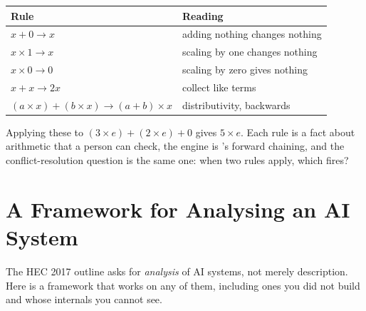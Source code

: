 \begin{examplebox}
\begin{tabular}{@{}L{6.0cm}L{8.6cm}@{}}
\toprule
\textbf{Rule} & \textbf{Reading} \\
\midrule
$x + 0 \to x$ & adding nothing changes nothing \\
$x \times 1 \to x$ & scaling by one changes nothing \\
$x \times 0 \to 0$ & scaling by zero gives nothing \\
$x + x \to 2x$ & collect like terms \\
$(a \times x) + (b \times x) \to (a+b) \times x$ & distributivity, backwards \\
\bottomrule
\end{tabular}

\smallskip
Applying these to $(3 \times e) + (2 \times e) + 0$ gives $5 \times e$. Each rule is
a fact about arithmetic that a person can check, the engine is
's forward chaining, and the conflict-resolution question is the same
one: when two rules apply, which fires?
\end{examplebox}

\section{A Framework for Analysing an AI System}

The HEC 2017 outline asks for \emph{analysis} of AI systems, not merely description.
Here is a framework that works on any of them, including ones you did not build and
whose internals you cannot see.

